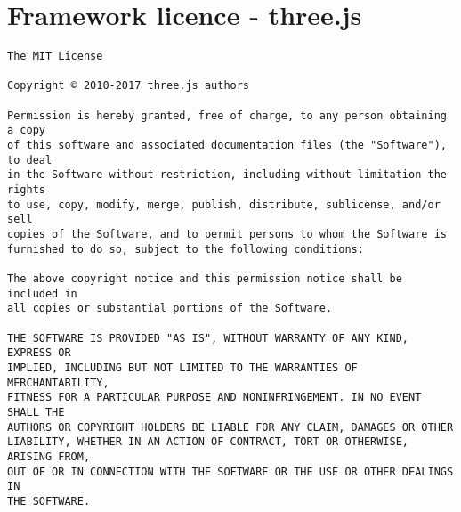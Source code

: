 \documentclass[twoside]{bhamthesis}
\begin{document}
\newpage

\section{Framework licence - three.js}

\begin{verbatim}
The MIT License

Copyright © 2010-2017 three.js authors

Permission is hereby granted, free of charge, to any person obtaining a copy
of this software and associated documentation files (the "Software"), to deal
in the Software without restriction, including without limitation the rights
to use, copy, modify, merge, publish, distribute, sublicense, and/or sell
copies of the Software, and to permit persons to whom the Software is
furnished to do so, subject to the following conditions:

The above copyright notice and this permission notice shall be included in
all copies or substantial portions of the Software.

THE SOFTWARE IS PROVIDED "AS IS", WITHOUT WARRANTY OF ANY KIND, EXPRESS OR
IMPLIED, INCLUDING BUT NOT LIMITED TO THE WARRANTIES OF MERCHANTABILITY,
FITNESS FOR A PARTICULAR PURPOSE AND NONINFRINGEMENT. IN NO EVENT SHALL THE
AUTHORS OR COPYRIGHT HOLDERS BE LIABLE FOR ANY CLAIM, DAMAGES OR OTHER
LIABILITY, WHETHER IN AN ACTION OF CONTRACT, TORT OR OTHERWISE, ARISING FROM,
OUT OF OR IN CONNECTION WITH THE SOFTWARE OR THE USE OR OTHER DEALINGS IN
THE SOFTWARE.
\end{verbatim}

\declaration
\end{document}
